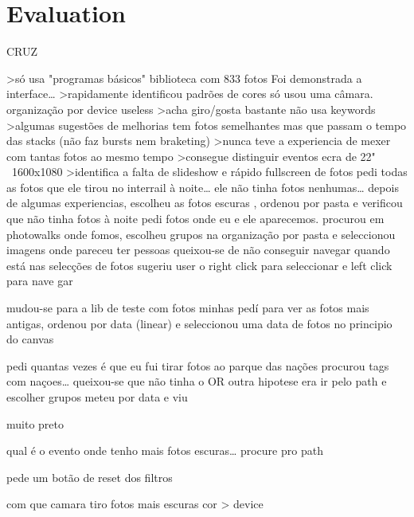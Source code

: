 \chapter{Evaluation} %
\label{chapter:evaluation}


CRUZ

>só usa "programas básicos"
biblioteca com 833 fotos
Foi demonstrada a interface…
>rapidamente identificou padrões de cores
só usou uma câmara. organização por device useless
>acha giro/gosta bastante
não usa keywords
>algumas sugestões de melhorias
tem fotos semelhantes mas que passam o tempo das stacks (não faz bursts nem braketing)
>nunca teve a experiencia de mexer com tantas fotos ao mesmo tempo
>consegue distinguir eventos
ecra de 22" ~1600x1080
>identifica a falta de slideshow e rápido fullscreen de fotos
pedi todas as fotos que ele tirou no interrail à noite… ele não tinha fotos nenhumas…
depois de algumas experiencias, escolheu as fotos escuras , ordenou por pasta e verificou que não tinha fotos à noite
pedi fotos onde eu e ele aparecemos. procurou em photowalks onde fomos, escolheu grupos na organização por pasta e seleccionou imagens onde pareceu ter pessoas
queixou-se de não conseguir navegar quando está nas selecções de fotos
sugeriu user o right click para seleccionar e left click para nave gar

mudou-se para a lib de teste com fotos minhas
pedí para ver as fotos mais antigas, ordenou por data (linear) e seleccionou uma data de fotos no principio do canvas

pedi quantas vezes é que eu fui tirar fotos ao parque das nações
procurou tags com naçoes… queixou-se que não tinha o OR 
outra hipotese era ir pelo path e escolher grupos
meteu por data e viu

muito preto

qual é o evento onde tenho mais fotos escuras…
procure pro path

pede um botão de reset dos filtros

com que camara tiro fotos mais escuras
cor > device


